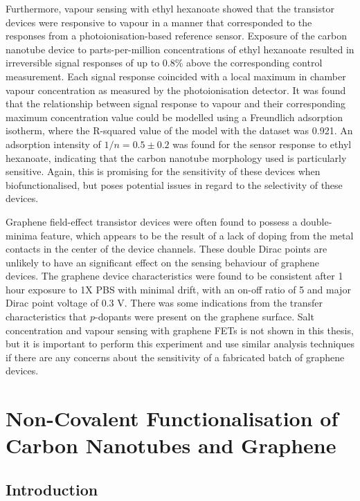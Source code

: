 \documentclass[
  a4paper,
]{scrbook}
\begin{document}
Furthermore, vapour sensing with ethyl hexanoate showed that the
transistor devices were responsive to vapour in a manner that
corresponded to the responses from a photoionisation-based reference
sensor. Exposure of the carbon nanotube device to parts-per-million
concentrations of ethyl hexanoate resulted in irreversible signal
responses of up to 0.8\% above the corresponding control measurement.
Each signal response coincided with a local maximum in chamber vapour
concentration as measured by the photoionisation detector. It was found
that the relationship between signal response to vapour and their
corresponding maximum concentration value could be modelled using a
Freundlich adsorption isotherm, where the R-squared value of the model
with the dataset was 0.921. An adsorption intensity of
\(1/n = 0.5\pm0.2\) was found for the sensor response to ethyl
hexanoate, indicating that the carbon nanotube morphology used is
particularly sensitive. Again, this is promising for the sensitivity of
these devices when biofunctionalised, but poses potential issues in
regard to the selectivity of these devices.

Graphene field-effect transistor devices were often found to possess a
double-minima feature, which appears to be the result of a lack of
doping from the metal contacts in the center of the device channels.
These double Dirac points are unlikely to have an significant effect on
the sensing behaviour of graphene devices. The graphene device
characteristics were found to be consistent after 1 hour exposure to 1X
PBS with minimal drift, with an on-off ratio of 5 and major Dirac point
voltage of 0.3 V. There was some indications from the transfer
characteristics that \(p\)-dopants were present on the graphene surface.
Salt concentration and vapour sensing with graphene FETs is not shown in
this thesis, but it is important to perform this experiment and use
similar analysis techniques if there are any concerns about the
sensitivity of a fabricated batch of graphene devices.


\hypertarget{non-covalent-functionalisation-of-carbon-nanotubes-and-graphene}{%
\chapter{Non-Covalent Functionalisation of Carbon Nanotubes and
Graphene}\label{non-covalent-functionalisation-of-carbon-nanotubes-and-graphene}}

\hypertarget{introduction-1}{%
\section{Introduction}\label{introduction-1}}
\end{document}

